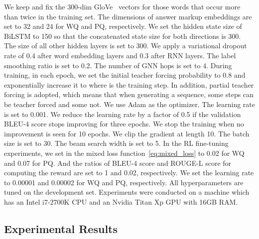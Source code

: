 \documentclass[journal]{IEEEtran}
\begin{document}
We keep and fix the 300-dim GloVe~\cite{pennington2014glove} vectors for those words that occur more than twice in the training set.
The dimensions of answer markup embeddings are set to 32 and 24 for WQ and PQ, respectively.
We set the hidden state size of BiLSTM to 150 so that the concatenated state size for both directions is 300.
The size of all other hidden layers is set to 300.
We apply a variational dropout~\cite{kingma2015variational} rate of 0.4 after word embedding layers and 0.3 after RNN layers.
The label smoothing ratio is set to 0.2.
The number of GNN hops is set to 4.
During training, 
in each epoch, we set the initial teacher forcing probability to 0.8 and exponentially increase it to  where  is the training step.
In addition, partial teacher forcing is adopted, which means that
when generating a sequence, some steps can be teacher forced and some not.
We use Adam \cite{kingma2014adam} as the optimizer.
The learning rate is set to 0.001.
We reduce the learning rate by a factor of 0.5 if the validation BLEU-4 score stops improving for three epochs. 
We stop the training when no improvement is seen for 10 epochs.
We clip the gradient at length 10.
The batch size is set to 30.
The beam search width is set to 5.
In the RL fine-tuning experiments, 
we set  in the mixed loss function~\cref{eq:mixed_loss} to 0.02 for WQ and 0.07 for PQ.
And the ratios of BLEU-4 score and ROUGE-L score for computing the reward are set to 1 and 0.02, respectively.
We set the learning rate to 0.00001 and 0.00002 for WQ and PQ, respectively.
All hyperparameters are tuned on the development set.
Experiments were conducted on a machine which has an Intel i7-2700K CPU and an Nvidia Titan Xp GPU with 16GB RAM.


\subsection{Experimental Results}
\end{document}
